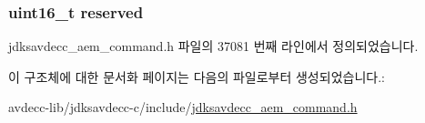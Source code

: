 \subsubsection[{\texorpdfstring{reserved}{reserved}}]{\setlength{\rightskip}{0pt plus 5cm}uint16\+\_\+t reserved}\hypertarget{structjdksavdecc__aem__command__auth__add__key__to__chain_a5a6ed8c04a3db86066924b1a1bf4dad3}{}\label{structjdksavdecc__aem__command__auth__add__key__to__chain_a5a6ed8c04a3db86066924b1a1bf4dad3}


jdksavdecc\+\_\+aem\+\_\+command.\+h 파일의 37081 번째 라인에서 정의되었습니다.



이 구조체에 대한 문서화 페이지는 다음의 파일로부터 생성되었습니다.\+:\begin{DoxyCompactItemize}
\item 
avdecc-\/lib/jdksavdecc-\/c/include/\hyperlink{jdksavdecc__aem__command_8h}{jdksavdecc\+\_\+aem\+\_\+command.\+h}\end{DoxyCompactItemize}
